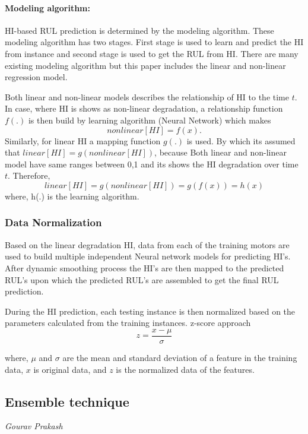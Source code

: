 \paragraph{Modeling algorithm:}
HI-based RUL prediction is determined by the modeling algorithm. These
modeling algorithm has two stages. First stage is used to learn and predict the HI from instance and second stage is
used to get the RUL from HI. There are many existing modeling algorithm but this paper includes the linear and non-linear
regression model.

Both linear and non-linear models describes the relationship of HI to the time $t$. In case, where HI is shows as non-linear
degradation, a relationship function $f(.)$ is then build by learning algorithm (Neural Network) which makes
\cite{DBLP:journals/tie/YangHZXLN16}
\begin{equation}
    nonlinear[HI]=f(x).
\end{equation}
Similarly, for linear HI a mapping function $g(.)$ is used. By which its assumed that $linear[HI] = g(nonlinear[HI])$, because
Both linear and non-linear model have same ranges between 0,1 and its shows the HI degradation over time $t$. Therefore,
\begin{equation}
    linear[HI] = g(nonlinear[HI]) = g(f(x)) = h(x)
\end{equation}
where, h(.) is the learning algorithm.

\subsubsection{Data Normalization}
Based on the linear degradation HI, data from each of the training motors are used to build multiple independent Neural network
models for predicting HI's. After dynamic smoothing process the HI's are then mapped to the predicted RUL's upon which the
predicted RUL's are assembled to get the final RUL prediction.

During the HI prediction, each testing instance is then normalized based on the parameters calculated from the training instances.
z-score approach
\begin{equation}
    z=\frac{x-\mu}{\sigma}
\end{equation}

where, $\mu$ and $\sigma$ are the mean and standard deviation of a feature in the training data, $x$ is original data, and $z$ is
the normalized data of the features.

\subsection{Ensemble technique}
\vspace*{-12.5mm}\hfill{\normalsize\emph{Gourav Prakash}}
\label{sec:hi_estimation:approaches:ensemble_technique}

